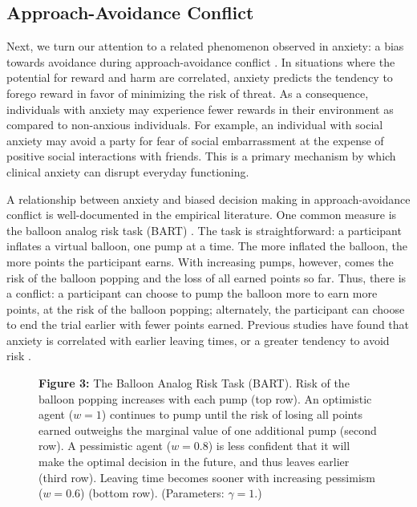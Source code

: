 \documentclass[11pt]{article} %
\begin{document}
\subsection{Approach-Avoidance Conflict}

Next, we turn our attention to a related phenomenon observed in anxiety: a bias towards avoidance during approach-avoidance conflict \citep{aupperle2010}. In situations where the potential for reward and harm are correlated,
anxiety predicts the tendency to forego reward in favor of minimizing the risk of threat. As a consequence, individuals with anxiety may experience fewer rewards in their environment as compared to non-anxious individuals. For example, an individual with social anxiety may avoid a party for fear of social embarrassment at the expense of positive social interactions with friends. This is a primary mechanism by which clinical anxiety can disrupt everyday functioning.

A relationship between anxiety and biased decision making in approach-avoidance conflict is well-documented in the empirical literature. One common measure is the balloon analog risk task (BART) \citep{Lejuez2002}. The task is straightforward: a participant inflates a virtual balloon, one pump at a time. The more inflated the balloon, the more points the participant earns. With increasing pumps, however, comes the risk of the balloon popping and the loss of all earned points so far. Thus, there is a conflict: a participant can choose to pump the balloon more to earn more points, at the risk of the balloon popping; alternately, the participant can choose to end the trial earlier with fewer points earned. Previous studies have found that anxiety is correlated with earlier leaving times, or a greater tendency to avoid risk \cite{Maner2007, Giorgetta2012}.

\begin{figure}
  \centerline{%
  }
  \par \textbf{Figure 3:} The Balloon Analog Risk Task (BART). Risk of the balloon popping increases with each pump (top row). An optimistic agent ($w=1$) continues to pump until the risk of losing all points earned outweighs the marginal value of one additional pump (second row). A pessimistic agent ($w=0.8$) is less confident that it will make the optimal decision in the future, and thus leaves earlier (third row). Leaving time becomes sooner with increasing pessimism ($w=0.6$) (bottom row). (Parameters: $\gamma = 1$.)
\end{figure}
\end{document}
